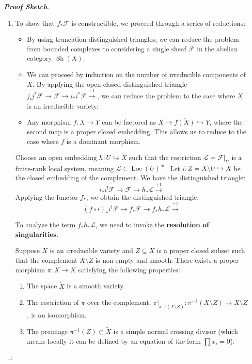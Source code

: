 \begin{proof}[\textbf{Proof Sketch}]
\begin{enumerate}
\begin{enumerate}
\item To show that $f_* \mathcal{F}$ is constructible, we proceed through a series of reductions:

\begin{itemize}
    \item By using truncation distinguished triangles, we can reduce the problem from bounded complexes to considering a single sheaf $\mathcal{F}$ in the abelian category $\operatorname{Sh}(X)$.
    
    \item We can proceed by induction on the number of irreducible components of $X$. By applying the open-closed distinguished triangle $j_! j^* \mathcal{F} \longrightarrow \mathcal{F} \longrightarrow i_* i^* \mathcal{F} \xrightarrow{+1}$, we can reduce the problem to the case where $X$ is an irreducible variety.
    
    \item Any morphism $f \colon X \longrightarrow Y$ can be factored as $X \longrightarrow \overline{f(X)} \hookrightarrow Y$, where the second map is a proper closed embedding. This allows us to reduce to the case where $f$ is a dominant morphism.
\end{itemize}
    Choose an open embedding $h \colon U \hookrightarrow X$ such that the restriction $\mathcal{L} = \mathcal{F}|_U$ is a finite-rank local system, meaning $\mathcal{L} \in \operatorname{Loc}(U)^{\text{fin}}$. Let $i \colon Z = X \setminus U \hookrightarrow X$ be the closed embedding of the complement. We have the distinguished triangle:
    \begin{equation*}
        i_* i^! \mathcal{F} \longrightarrow \mathcal{F} \longrightarrow h_* \mathcal{L} \xrightarrow{+1}
    \end{equation*}
    Applying the functor $f_*$, we obtain the distinguished triangle:
    \begin{equation*}
        (f \circ i)_* i^! \mathcal{F} \longrightarrow f_* \mathcal{F} \longrightarrow f_* h_* \mathcal{L} \xrightarrow{+1}
    \end{equation*}

To analyze the term $f_* h_* \mathcal{L}$, we need to invoke the \textbf{resolution of singularities}. 

    Suppose $X$ is an irreducible variety and $Z \subsetneq X$ is a proper closed subset such that the complement $X \setminus Z$ is non-empty and smooth. There exists a proper morphism $\pi \colon \widetilde{X} \longrightarrow X$ satisfying the following properties:
\begin{enumerate}
    \item The space $\widetilde{X}$ is a smooth variety.
    \item The restriction of $\pi$ over the complement, $\pi|_{\pi^{-1}(X \setminus Z)} \colon \pi^{-1}(X \setminus Z) \longrightarrow X \setminus Z$, is an isomorphism.
    \item The preimage $\pi^{-1}(Z) \subset \widetilde{X}$ is a simple normal crossing divisor (which means locally it can be defined by an equation of the form $\prod x_i = 0$).
\end{enumerate}


\end{enumerate}
\end{enumerate}
\end{proof}
